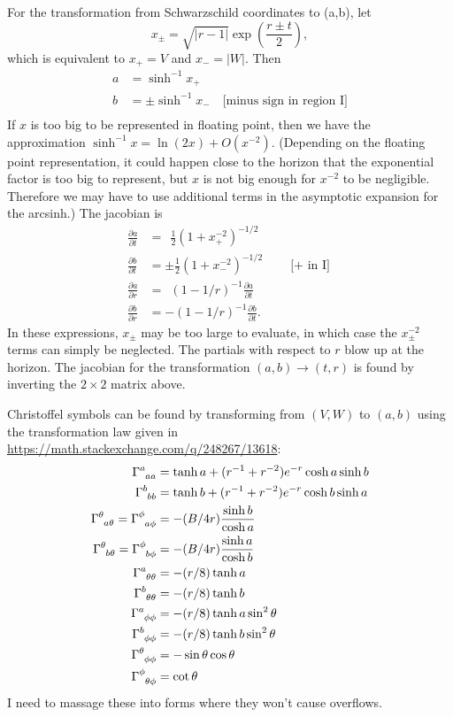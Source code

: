 \documentclass{article}
\begin{document}
For the transformation from Schwarzschild coordinates to (a,b), let
\begin{equation*}
  x_\pm = \sqrt{|r-1|}\exp\left(\frac{r\pm t}{2}\right),
\end{equation*}
which is equivalent to $x_+= V$ and $x_-=|W|$.
Then
\begin{align*}
  a &= \sinh^{-1} x_+ \\
  b &= \pm\sinh^{-1} x_- \quad \text{[minus sign in region I]} \\
\end{align*}
If $x$ is too big to be represented in floating point, then we have the approximation
$\sinh^{-1} x = \ln(2x)+O(x^{-2})$. (Depending on the floating point representation,
it could happen close to the horizon that the exponential
factor is too big to represent, but $x$ is not big enough for $x^{-2}$ to be negligible.
Therefore we may have to use additional terms in the asymptotic expansion for the arcsinh.)
The jacobian is
\begin{align*}
  \frac{\partial a}{\partial t} &= \ \ \frac{1}{2}(1+x_+^{-2})^{-1/2} \\
  \frac{\partial b}{\partial t} &= \pm\frac{1}{2}(1+x_-^{-2})^{-1/2} \qquad \text{[$+$ in I]} \\
  \frac{\partial a}{\partial r} &= \ \ (1-1/r)^{-1} \frac{\partial a}{\partial t} \\
  \frac{\partial b}{\partial r} &= -(1-1/r)^{-1} \frac{\partial b}{\partial t}.
\end{align*}
In these expressions, $x_\pm$ may be too large to evaluate, in which case the $x_\pm^{-2}$ terms
can simply be neglected. The partials with respect to $r$ blow up at the horizon. The jacobian
for the transformation $(a,b)\rightarrow(t,r)$ is found by inverting the $2\times 2$ matrix
above.

Christoffel symbols can be found by transforming from $(V,W)$ to $(a,b)$ using the
transformation law given in \url{https://math.stackexchange.com/q/248267/13618}:
\begin{align*}
\Gamma\indices{^a_a_a} &= \tanh a + (r^{-1}+r^{-2})e^{-r}\cosh a\sinh b \\
\Gamma\indices{^b_b_b} &= \tanh b + (r^{-1}+r^{-2})e^{-r}\cosh b\sinh a \\
\Gamma\indices{^\theta_a_\theta} = \Gamma\indices{^\phi_a_\phi} &= -(B/4r)\frac{\sinh b}{\cosh a}  \\
\Gamma\indices{^\theta_b_\theta} = \Gamma\indices{^\phi_b_\phi} &= -(B/4r)\frac{\sinh a}{\cosh b}  \\
%
\Gamma\indices{^a_\theta_\theta} &= -(r/8)\tanh a\\
\Gamma\indices{^b_\theta_\theta} &= -(r/8)\tanh b\\
\Gamma\indices{^a_\phi_\phi} &= -(r/8) \tanh a\sin^2\theta\\
\Gamma\indices{^b_\phi_\phi} &= -(r/8) \tanh b\sin^2\theta\\
%
\Gamma\indices{^\theta_\phi_\phi} &= -\sin\theta \cos\theta   \\
\Gamma\indices{^\phi_\theta_\phi} &= \cot\theta   
\end{align*}
I need to massage these into forms where they won't cause overflows.
\end{document}
